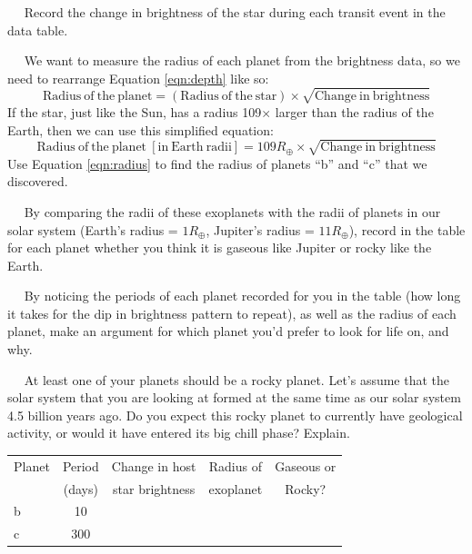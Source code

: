 \documentclass[12pt]{article}
\newcommand{\question}[1]{\vspace{10mm} \noindent {\bf #1)}~~}
\begin{document}
\question{1} Record the change in brightness of the star during each transit event in the data table. 

\question{2} We want to measure the radius of each planet from the brightness data, so we need to rearrange Equation \ref{eqn:depth} like so:
\begin{equation}
\mathrm{Radius~of~the~planet} = \left( \mathrm{Radius~of~the~star} \right) \times \sqrt{\mathrm{Change~in~brightness}}
\end{equation}
If the star, just like the Sun, has a radius 109$\times$ larger than the radius of the Earth, then we can use this simplified equation:
\begin{equation}
\mathrm{Radius~of~the~planet~[in~Earth~radii]} = 109R_\oplus  \times \sqrt{\mathrm{Change~in~brightness}} \label{eqn:radius}
\end{equation}
Use Equation \ref{eqn:radius} to find the radius of planets ``b'' and ``c'' that we discovered. 

\question{3} By comparing the radii of these exoplanets with the radii of planets in our solar system (Earth's radius = $1 R_\oplus$, Jupiter's radius = $11 R_\oplus$), record in the table for each planet whether you think it is gaseous like Jupiter or rocky like the Earth.

\question{4} By noticing the periods of each planet recorded for you in the table (how long it takes for the dip in brightness pattern to repeat), as well as the radius of each planet, make an argument for which planet you'd prefer to look for life on, and why.
\vspace{6 cm}

\question{5} At least one of your planets should be a rocky planet. Let's assume that the solar system that you are looking at formed at the same time as our solar system 4.5 billion years ago. Do you expect this rocky planet to currently have geological activity, or would it have entered its big chill phase? Explain.
\vspace{6 cm}



\vspace{3cm}
\begin{table}[h!]
\centering
\begin{tabular}{|l |c |c| c| c|}
\hline
Planet & Period & Change in host & Radius of & Gaseous or   \\
 & (days) & star brightness  &  exoplanet    & Rocky? \\ \hline
b & 10 & & & \\ \hline
c & 300 & & & \\ \hline
\end{tabular}
\end{table}
\end{document}
